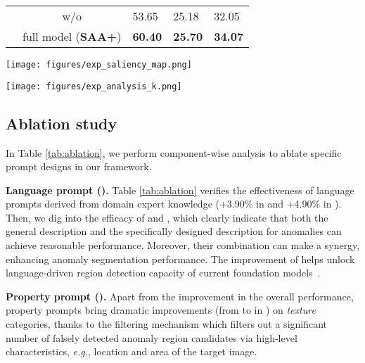 \documentclass{article}
\makeatletter
\newcommand\figcaption{\def\@captype{figure}\caption}
\makeatother
\begin{document}
\begin{figtab}
\begin{minipage}{0.48\linewidth}
{\begin{tabular}{ccllll}
                     & \multicolumn{2}{c}{w/o }             & 53.65          & 25.18          & 32.05          \\ \cmidrule(){2-6}
                     & \multicolumn{2}{c}{full model (\textbf{SAA+})}               & \textbf{60.40} & \textbf{25.70} & \textbf{34.07} \\ \bottomrule
\end{tabular}}\label{tab:ablation}
  \end{minipage}
  \hfill
  \begin{minipage}[t]{0.48\linewidth}
      \vspace{-50mm}
    \centering
    \texttt{[image: figures/exp\_saliency\_map.png]}
    \vspace{-6mm}
    \figcaption{Effects of disabling () and abling ()  prompts () of saliency maps () on the final anomaly segmentation.}
  \label{fig:influence_PS} 
  \vspace{2mm}
    \centering
    \texttt{[image: figures/exp\_analysis\_k.png]}
        \vspace{-1mm}
    \figcaption{Sensitivity analysis of hyperparameter  of confidence prompts ().}
  \label{fig:influence_K}
  \end{minipage}\vspace{-2mm}
\end{figtab}

\subsection{Ablation study}
\label{sec:ablation}
In Table \ref{tab:ablation}, we perform component-wise analysis to ablate specific prompt designs in our framework.






\noindent\textbf{Language prompt ().} Table \ref{tab:ablation} verifies the effectiveness of language prompts derived from domain expert knowledge (+3.90\% in  and +4.90\% in ). Then, we dig into the efficacy of  and , which clearly indicate that both the general description and the specifically designed description for anomalies can achieve reasonable performance. Moreover, their combination can make a synergy, enhancing anomaly segmentation performance. The improvement of  helps unlock language-driven region detection capacity of current foundation models~\cite{liu2023grounding,kirillov2023segment}. 

\noindent\textbf{Property prompt ().} Apart from the improvement in the overall performance, property prompts bring dramatic improvements (from  to  in ) on \textit{texture} categories, thanks to the filtering mechanism which filters out a significant number of falsely detected anomaly region candidates via high-level characteristics, \textit{e.g.}, location and area of the target image. 
\end{document}
